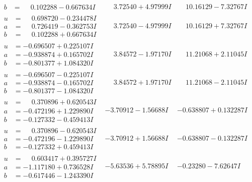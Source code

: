 \documentclass[1p]{elsarticle_modified}
\theoremstyle{definition}
\begin{document}
$$\begin{array}{c|c|c}
\begin{aligned}
b &= \phantom{-}0.102288 - 0.667634 I\end{aligned}
 & \phantom{-}3.72540 + 4.97999 I & \phantom{-}10.16129 - 7.32767 I \\ \hline\begin{aligned}
u &= \phantom{-}0.698720 - 0.234478 I \\
a &= \phantom{-}0.726419 - 0.362753 I \\
b &= \phantom{-}0.102288 + 0.667634 I\end{aligned}
 & \phantom{-}3.72540 - 4.97999 I & \phantom{-}10.16129 + 7.32767 I \\ \hline\begin{aligned}
u &= -0.696507 + 0.225107 I \\
a &= -0.938874 + 0.165702 I \\
b &= -0.801377 + 1.084320 I\end{aligned}
 & \phantom{-}3.84572 - 1.97170 I & \phantom{-}11.21068 + 2.11045 I \\ \hline\begin{aligned}
u &= -0.696507 - 0.225107 I \\
a &= -0.938874 - 0.165702 I \\
b &= -0.801377 - 1.084320 I\end{aligned}
 & \phantom{-}3.84572 + 1.97170 I & \phantom{-}11.21068 - 2.11045 I \\ \hline\begin{aligned}
u &= \phantom{-}0.370896 + 0.620543 I \\
a &= -0.472196 + 1.229890 I \\
b &= -0.127332 - 0.459413 I\end{aligned}
 & -3.70912 - 1.56688 I & -0.638807 + 0.132287 I \\ \hline\begin{aligned}
u &= \phantom{-}0.370896 - 0.620543 I \\
a &= -0.472196 - 1.229890 I \\
b &= -0.127332 + 0.459413 I\end{aligned}
 & -3.70912 + 1.56688 I & -0.638807 - 0.132287 I \\ \hline\begin{aligned}
u &= \phantom{-}0.603417 + 0.395727 I \\
a &= -1.117180 + 0.736528 I \\
b &= -0.617446 - 1.243390 I\end{aligned}
 & -5.63536 + 5.78895 I & -0.23280 - 7.62647 I \\ \hline\begin{aligned}

\end{aligned}
\end{array}$$
\end{document}
